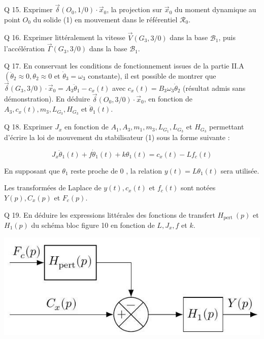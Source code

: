 \documentclass[10pt]{article}
\begin{document}
Q 15. Exprimer $\vec{\delta}\left(O_{0}, 1 / 0\right) \cdot \vec{x}_{0}$, la projection sur $\vec{x}_{0}$ du moment dynamique au point $O_{0}$ du solide (1) en mouvement dans le référentiel $\mathcal{R}_{0}$.

Q 16. Exprimer littéralement la vitesse $\vec{V}\left(G_{3}, 3 / 0\right)$ dans la base $\mathcal{B}_{1}$, puis l'accélération $\vec{\Gamma}\left(G_{3}, 3 / 0\right)$ dans la base $\mathcal{B}_{1}$.

Q 17. En conservant les conditions de fonctionnement issues de la partie II.A $\left(\ddot{\theta}_{2} \approx 0, \theta_{2} \approx 0\right.$ et $\dot{\theta}_{3}=\omega_{3}$ constante), il est possible de montrer que $\vec{\delta}\left(G_{3}, 3 / 0\right) \cdot \vec{x}_{0}=A_{3} \ddot{\theta}_{1}-c_{x}(t)$ avec $c_{x}(t)=B_{3} \omega_{3} \dot{\theta}_{2}$ (résultat admis sans démonstration). En déduire $\vec{\delta}\left(O_{0}, 3 / 0\right) \cdot \vec{x}_{0}$, en fonction de $A_{3}, c_{x}(t), m_{3}, L_{G_{3}}, H_{G_{3}}$ et $\ddot{\theta}_{1}(t)$.

Q 18. Exprimer $J_{x}$ en fonction de $A_{1}, A_{3}, m_{1}, m_{3}, L_{G_{1}}, L_{G_{3}}$ et $H_{G_{3}}$ permettant d'écrire la loi de mouvement du stabilisateur (1) sous la forme suivante :

$$
J_{x} \ddot{\theta}_{1}(t)+f \dot{\theta}_{1}(t)+k \theta_{1}(t)=c_{x}(t)-L f_{c}(t)
$$

En supposant que $\theta_{1}$ reste proche de 0 , la relation $y(t)=L \theta_{1}(t)$ sera utilisée.

Les transformées de Laplace de $y(t), c_{x}(t)$ et $f_{c}(t)$ sont notées $Y(p), C_{x}(p)$ et $F_{c}(p)$.

Q 19. En déduire les expressions littérales des fonctions de transfert $H_{\text {pert }}(p)$ et $H_{1}(p)$ du schéma bloc figure 10 en fonction de $L, J_{x}, f$ et $k$.

\begin{center}
\includegraphics[max width=\textwidth]{2023_07_26_54f5e859400a10e656ddg-07}
\end{center}
\end{document}
